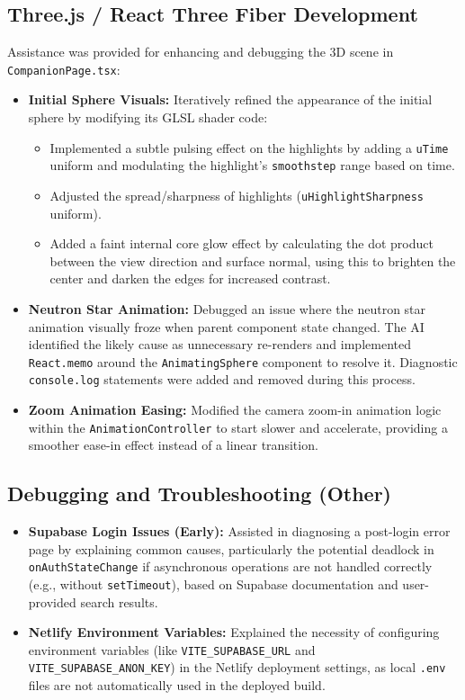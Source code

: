 \documentclass[11pt]{article} %
\begin{document}
\subsection*{Three.js / React Three Fiber Development}
Assistance was provided for enhancing and debugging the 3D scene in \texttt{CompanionPage.tsx}:
\begin{itemize}
    \item \textbf{Initial Sphere Visuals:} Iteratively refined the appearance of the initial sphere by modifying its GLSL shader code:\
    \begin{itemize}
        \item Implemented a subtle pulsing effect on the highlights by adding a \texttt{uTime} uniform and modulating the highlight's \texttt{smoothstep} range based on time.
        \item Adjusted the spread/sharpness of highlights (\texttt{uHighlightSharpness} uniform).
        \item Added a faint internal core glow effect by calculating the dot product between the view direction and surface normal, using this to brighten the center and darken the edges for increased contrast.
    \end{itemize}
    \item \textbf{Neutron Star Animation:} Debugged an issue where the neutron star animation visually froze when parent component state changed. The AI identified the likely cause as unnecessary re-renders and implemented \texttt{React.memo} around the \texttt{AnimatingSphere} component to resolve it. Diagnostic \texttt{console.log} statements were added and removed during this process.
    \item \textbf{Zoom Animation Easing:} Modified the camera zoom-in animation logic within the \texttt{AnimationController} to start slower and accelerate, providing a smoother ease-in effect instead of a linear transition.
\end{itemize}

\subsection*{Debugging and Troubleshooting (Other)}
\begin{itemize}
    \item \textbf{Supabase Login Issues (Early):} Assisted in diagnosing a post-login error page by explaining common causes, particularly the potential deadlock in \texttt{onAuthStateChange} if asynchronous operations are not handled correctly (e.g., without \texttt{setTimeout}), based on Supabase documentation and user-provided search results.
    \item \textbf{Netlify Environment Variables:} Explained the necessity of configuring environment variables (like \texttt{VITE\_SUPABASE\_URL} and \texttt{VITE\_SUPABASE\_ANON\_KEY}) in the Netlify deployment settings, as local \texttt{.env} files are not automatically used in the deployed build.
\end{itemize}
\end{document}
